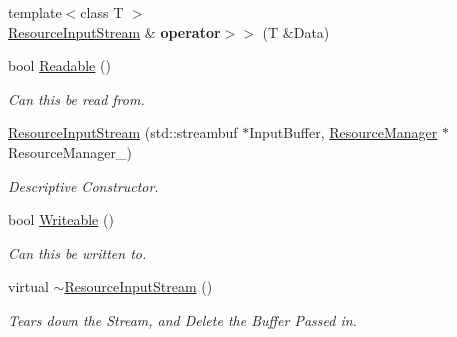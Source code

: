 \begin{DoxyCompactItemize}
\item 
\hypertarget{classMezzanine_1_1ResourceInputStream_a241faad0fdcadeca6288a3f49797c05d}{
{\footnotesize template$<$class T $>$ }\\\hyperlink{classMezzanine_1_1ResourceInputStream}{ResourceInputStream} \& {\bfseries operator$>$$>$} (T \&Data)}
\label{classMezzanine_1_1ResourceInputStream_a241faad0fdcadeca6288a3f49797c05d}

\item 
bool \hyperlink{classMezzanine_1_1ResourceInputStream_a1a09cf1e237b4344df907b799af52e96}{Readable} ()
\begin{DoxyCompactList}\small\item\em Can this be read from. \item\end{DoxyCompactList}\item 
\hyperlink{classMezzanine_1_1ResourceInputStream_a03a7bc47014d7d27cf0db3c0fff68715}{ResourceInputStream} (std::streambuf $\ast$InputBuffer, \hyperlink{classMezzanine_1_1ResourceManager}{ResourceManager} $\ast$ResourceManager\_\-)
\begin{DoxyCompactList}\small\item\em Descriptive Constructor. \item\end{DoxyCompactList}\item 
bool \hyperlink{classMezzanine_1_1ResourceInputStream_ae2fa58b048fedc97126184a72ccb7689}{Writeable} ()
\begin{DoxyCompactList}\small\item\em Can this be written to. \item\end{DoxyCompactList}\item 
\hypertarget{classMezzanine_1_1ResourceInputStream_ac99716411e0277ffd97b2db98003fc54}{
virtual \hyperlink{classMezzanine_1_1ResourceInputStream_ac99716411e0277ffd97b2db98003fc54}{$\sim$ResourceInputStream} ()}
\label{classMezzanine_1_1ResourceInputStream_ac99716411e0277ffd97b2db98003fc54}

\begin{DoxyCompactList}\small\item\em Tears down the Stream, and Delete the Buffer Passed in. \item\end{DoxyCompactList}\end{DoxyCompactItemize}


